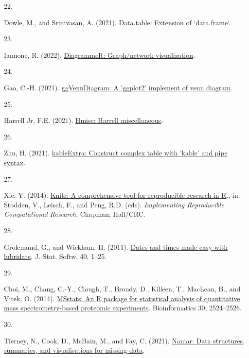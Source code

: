 \documentclass[
]{article}
\newlength{\cslhangindent}
\newlength{\csllabelwidth}
\newlength{\cslentryspacingunit} %
\newenvironment{CSLReferences}[2] %
 {%
  \setlength{\parindent}{0pt}
  \ifodd #1
  \let\oldpar\par
  \def\par{\hangindent=\cslhangindent\oldpar}
  \fi
  \setlength{\parskip}{#2\cslentryspacingunit}
 }%
 {}
\newcommand{\CSLLeftMargin}[1]{\parbox[t]{\csllabelwidth}{#1}}
\newcommand{\CSLRightInline}[1]{\parbox[t]{\linewidth - \csllabelwidth}{#1}\break}
\begin{document}
\begin{CSLReferences}{0}{0}
\leavevmode{}%
\CSLLeftMargin{22. }
\CSLRightInline{Dowle, M., and Srinivasan, A. (2021). \href{https://CRAN.R-project.org/package=data.table}{Data.table: Extension of `data.frame`}.}

\leavevmode{}%
\CSLLeftMargin{23. }
\CSLRightInline{Iannone, R. (2022). \href{https://CRAN.R-project.org/package=DiagrammeR}{DiagrammeR: Graph/network visualization}.}

\leavevmode{}%
\CSLLeftMargin{24. }
\CSLRightInline{Gao, C.-H. (2021). \href{https://CRAN.R-project.org/package=ggVennDiagram}{ggVennDiagram: A 'ggplot2' implement of venn diagram}.}

\leavevmode{}%
\CSLLeftMargin{25. }
\CSLRightInline{Harrell Jr, F.E. (2021). \href{https://CRAN.R-project.org/package=Hmisc}{Hmisc: Harrell miscellaneous}.}

\leavevmode{}%
\CSLLeftMargin{26. }
\CSLRightInline{Zhu, H. (2021). \href{https://CRAN.R-project.org/package=kableExtra}{kableExtra: Construct complex table with 'kable' and pipe syntax}.}

\leavevmode{}%
\CSLLeftMargin{27. }
\CSLRightInline{Xie, Y. (2014). \href{http://www.crcpress.com/product/isbn/9781466561595}{Knitr: A comprehensive tool for reproducible research in {R}}., in: Stodden, V., Leisch, F., and Peng, R.D. (eds). \emph{Implementing Reproducible Computational Research}. Chapman; Hall/CRC.}

\leavevmode{}%
\CSLLeftMargin{28. }
\CSLRightInline{Grolemund, G., and Wickham, H. (2011). \href{https://www.jstatsoft.org/v40/i03/}{Dates and times made easy with {lubridate}}. J. Stat. Softw. 40, 1--25.}

\leavevmode{}%
\CSLLeftMargin{29. }
\CSLRightInline{Choi, M., Chang, C.-Y., Clough, T., Broudy, D., Killeen, T., MacLean, B., and Vitek, O. (2014). \href{https://doi.org/10.1093/bioinformatics/btu305}{{MSstats}: An {R} package for statistical analysis of quantitative mass spectrometry-based proteomic experiments}. Bioinformatics 30, 2524--2526.}

\leavevmode{}%
\CSLLeftMargin{30. }
\CSLRightInline{Tierney, N., Cook, D., McBain, M., and Fay, C. (2021). \href{https://CRAN.R-project.org/package=naniar}{Naniar: Data structures, summaries, and visualisations for missing data}.}


\end{CSLReferences}
\end{document}
